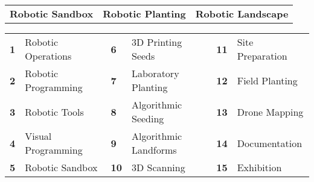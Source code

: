 \documentclass[11pt,article,oneside]{memoir}
\begin{document}

\vspace*{-1em}
\begin{table}[H]
\footnotesize
\begin{tabular}{l @{\hskip 1.6cm} l @{\hskip 2.1cm} l}
\textbf{Robotic Sandbox} & \textbf{Robotic Planting} & \textbf{Robotic Landscape}\\
\end{tabular}
\end{table}
%
\vspace*{-2em}
%
\begin{table}[H]
\footnotesize
\begin{tabular}{l l l l l l}
\small
\textbf{1} & Robotic Operations  & \textbf{6} & 3D Printing Seeds & \textbf{11} & Site Preparation\\
\textbf{2} & Robotic Programming & \textbf{7} & Laboratory Planting & \textbf{12} & Field Planting\\
\textbf{3} &  Robotic Tools & \textbf{8} & Algorithmic Seeding & \textbf{13} & Drone Mapping\\
\textbf{4} & Visual Programming & \textbf{9} & Algorithmic Landforms & \textbf{14} & Documentation\\
\textbf{5} & Robotic Sandbox & \textbf{10} & 3D Scanning & \textbf{15} & Exhibition\\
\end{tabular}
\end{table}
\end{document}
